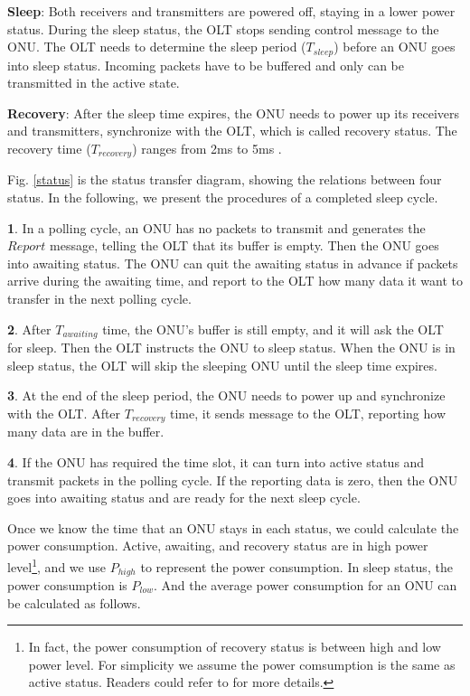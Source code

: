 \documentclass[journal]{IEEEtran}
\begin{document}
\textbf{Sleep}: Both receivers and transmitters are powered off, staying in a lower power status. During the sleep status, the OLT stops sending control message to the ONU. The OLT needs to determine the sleep period ($T_{sleep}$) before an ONU goes into sleep status. Incoming packets have to be buffered and only can be transmitted in the active state.

\textbf{Recovery}: After the sleep time expires, the ONU needs to power up its receivers and transmitters, synchronize with the OLT, which is called recovery status. The recovery time ($T_{recovery}$) ranges from 2ms to 5ms \cite{mandin2008epon}.

Fig. \ref{status} is the status transfer diagram, showing the relations between four status. In the following, we present the procedures of a completed sleep cycle.

\textbf{1}. In a polling cycle, an ONU has no packets to transmit and generates the $Report$ message, telling the OLT that its buffer is empty. Then the ONU goes into awaiting status. The ONU 
can quit the awaiting status in advance if packets arrive during the awaiting time, and report to the OLT how many data it want to transfer in the next polling cycle.

\textbf{2}. After $T_{awaiting}$ time, the ONU's buffer is still empty, and it will ask the OLT for sleep. Then the OLT instructs the ONU to sleep status. When the ONU is in sleep status, the OLT will skip the sleeping ONU until the sleep time expires.

\textbf{3}. At the end of the sleep period, the ONU needs to power up and synchronize with the OLT. After $T_{recovery}$ time, it sends message to the OLT, reporting how many data are in the buffer. 

\textbf{4}. If the ONU has required the time slot, it can turn into active status and transmit packets in the polling cycle. If the reporting data is zero, then the ONU goes into awaiting status and are ready for the next sleep cycle.

Once we know the time that an ONU stays in each status, we could calculate the power consumption. Active, awaiting, and recovery status are in high power level\footnote{In fact, the power consumption of recovery status is between high and low power level. For simplicity we assume the power comsumption is the same as active status. Readers could refer to \cite{6172273} for more details.}, and we use $P_{high}$ to represent the power consumption. In sleep status, the power consumption is $P_{low}$. And the average power consumption for an ONU can be calculated as follows.
\end{document}
